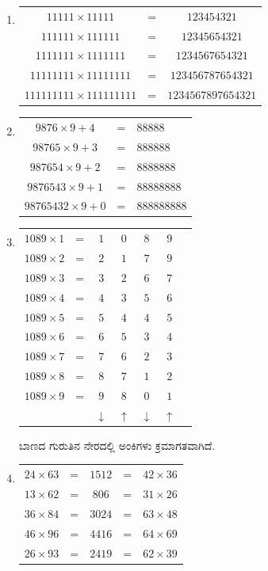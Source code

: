 \begin{enumerate}
\item 

\begin{tabular}[t]{ccc}
$11111 \times 11111$ & = & $123454321$\\
$111111 \times 111111$ & = & $12345654321$\\
$1111111 \times 1111111$ & = & $1234567654321$\\
$11111111 \times 11111111$ & = & $123456787654321$\\
$111111111 \times 111111111$ & = & $1234567897654321$\\
\end{tabular}

\item 

\begin{tabular}[t]{ccl}
$9876 \times 9 + 4$ & = & $88888$\\
$98765 \times 9 + 3$ & = & $888888$\\
$987654 \times 9 + 2$ & = & $8888888$\\
$9876543 \times 9 + 1$& = & $88888888$\\
$98765432 \times 9 + 0$ & = & $888888888$
\end{tabular}

\item 

\begin{tabular}[t]{ccccccc}
$1089 \times 1$ & = & $1$&$0$&$8$&$9$\\
$1089 \times 2$ & = & $2$&$1$&$7$&$9$\\
$1089 \times 3$ & = & $3$&$2$&$6$&$7$\\
$1089 \times 4$ & = & $4$&$3$&$5$&$6$\\
$1089 \times 5$ & = & $5$&$4$&$4$&$5$\\
$1089 \times 6$ & = & $6$&$5$&$3$&$4$\\
$1089 \times 7$ & = & $7$&$6$&$2$&$3$\\
$1089 \times 8$ & = & $8$&$7$&$1$&$2$\\
$1089 \times 9$ & = & $9$&$8$&$0$&$1$\\
& & $\downarrow$&$\uparrow$&$\downarrow$&$\uparrow $
\end{tabular}

ಬಾಣದ ಗುರುತಿನ ನೇರದಲ್ಲಿ ಅಂಕಿಗಳು ಕ್ರಮಾಗತವಾಗಿದೆ. 

\item 
\begin{tabular}[t]{ccccc}
$24 \times 63$ & = & $1512$ & = & $42 \times 36$\\
$13 \times 62$ & = & $806$ & = & $31 \times 26$\\
$36 \times 84$ & = & $3024$ & = & $63 \times 48$\\
$46 \times 96$ & = & $4416$ & = & $64 \times 69$\\
$26 \times 93$ & = & $2419$ & = & $62 \times 39$\\
\end{tabular}


\end{enumerate}
